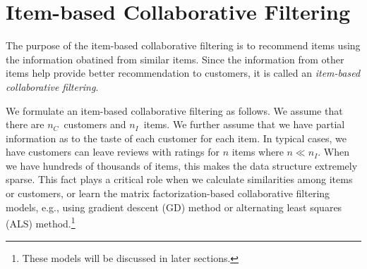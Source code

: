 
\newcommand{\numcus}{\ensuremath{{n_C}}}
\newcommand{\numitem}{\ensuremath{{n_I}}}
\newcommand{\numfeat}{\ensuremath{{n_F}}}
\newcommand{\numrating}{\ensuremath{{n_R}}}
\newcommand{\nan}{\ensuremath{\mathrm{NaN}}}
\newcommand{\ratmat}{\ensuremath{R}}
\newcommand{\ratvec}{r}
\newcommand{\ratmataggr}{\ensuremath{\bar{\ratmat}}}
\newcommand{\ratmatnorm}{\ensuremath{\tilde{\ratmat}}}
\newcommand{\ratmatpred}{\hat{\ratmat}}
\newcommand{\datsourceset}{\ensuremath{\mathcal{S}}}
\newcommand{\dir}{\mathrm{Dir}}
\newcommand{\simil}{s}
\newcommand{\bmscore}{\mathrm{bm}_{25}}
\newcommand{\avgcl}{\ensuremath{\bar{c}}}

\newcommand{\numfactors}{\ensuremath{{n_L}}}
\newcommand{\lfcn}{\ensuremath{l}}
\newcommand{\confvar}{c}
\newcommand{\confmat}{C}
\newcommand{\binvar}{p}
\newcommand{\binmat}{P}

\newcommand{\Xsvd}{\XYsvd{X}}
\newcommand{\Ysvd}{\XYsvd{Y}}
\newcommand{\XYsvd}[1]{{#1}_\mathrm{svd}}

\newcommand{\XY}[2]{{{#1}_{#2}}}
\newcommand{\XX}[1]{\XY{X}{#1}}
\newcommand{\YY}[1]{\XY{Y}{#1}}

\newcommand{\initX}{\tilde{X}}
\newcommand{\initY}{\tilde{Y}}

\newcommand{\Xsim}{\ensuremath{X^\mathrm{sim}}}
\newcommand{\Ysim}{\ensuremath{Y^\mathrm{sim}}}

\newcommand{\popest}{{\hat{\theta}}}
\newcommand{\popestk}[1]{\ensuremath{\popest_{#1}}}


\newpage

\section{Item-based Collaborative Filtering}

The purpose of the item-based collaborative filtering is to recommend items using the information obatined from similar items.
Since the information from other items help provide better recommendation to customers,
it is called an \emph{item-based collaborative filtering}.

We formulate an item-based collaborative filtering as follows.
We assume that there are \numcus\ customers and \numitem\ items.
We further assume that we have partial information as to the taste of each customer for each item.
In typical cases,
we have customers can leave reviews with ratings for $n$ items where $n \ll \numitem$.
When we have hundreds of thousands of items, this makes the data structure extremely sparse.
This fact plays a critical role when we calculate similarities among items or customers,
or learn the matrix factorization-based collaborative filtering models,
e.g., using gradient descent (GD) method or alternating least squares (ALS) method.\footnote{
    These models will be discussed in later sections.
}

